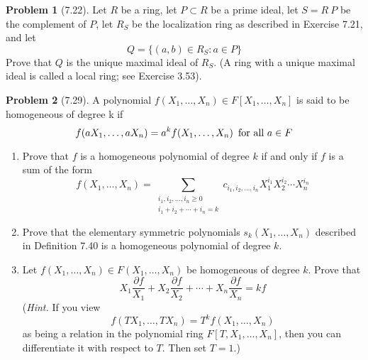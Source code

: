 \documentclass[12pt]{article}
\theoremstyle{definition}
\newtheorem{problem}{Problem}
\begin{document}
\begin{problem}[7.22]
    Let $R$ be a ring, let $P \subset R$ be a prime ideal, let $S = R \ P$ be the complement of $P$, let $R_S$
    be the localization ring as described in Exercise 7.21, and let
    \[
        Q = \{ (a, b) \in R_S : a \in P \}
    \]
    Prove that $Q$ is the unique maximal ideal of $R_S$. (A ring with a unique maximal ideal is called a local
    ring; see Exercise 3.53).

    \begin{solution}

    \end{solution}
\end{problem}

\begin{problem}[7.29]
    A polynomial $f(X_1, \ldots, X_n) \in F[X_1, \ldots, X_n]$ is said to be homogeneous of degree k if
    \[
        f(aX_1, \ldots, aX_n) = a^kf(X_1, \ldots, X_n) \hspace{5px} \text{for all } a \in F
    \]
    \begin{enumerate}[label=(\alph*)]
        \item Prove that $f$ is a homogeneous polynomial of degree $k$ if and only if $f$ is a sum of the form
              \[
                f(X_1, \ldots, X_n) = \sum_{\substack{i_1, i_2, \ldots, i_n \geq 0\\ i_1 + i_2 + \cdots + i_n = k}} c_{i_1, i_2, \ldots, i_n} X_1^{i_1} X_2^{i_2} \cdots X_n^{i_n}
              \]
        \begin{solution}

        \end{solution}

        \item Prove that the elementary symmetric polynomials $s_k (X_1, \ldots, X_n)$ described in Definition 7.40
              is a homogeneous polynomial of degree $k$.
        \begin{solution}

        \end{solution}

        \item Let $f(X_1, \ldots, X_n) \in F(X_1, \ldots, X_n)$ be homogeneous of degree $k$. Prove that
              \[
                X_1 \frac{\partial{f}}{X_1} + X_2 \frac{\partial{f}}{X_2} + \cdots + X_n \frac{\partial{f}}{X_n} = kf
              \]
              (\textit{Hint.} If you view
              \[
                f(TX_1, \ldots, TX_n) = T^k f(X_1, \ldots, X_n)
              \]
              as being a relation in the polynomial ring $F[T, X_1, \ldots, X_n]$, then you can differentiate it with
              respect to $T$. Then set $T = 1$.)
        \begin{solution}

        \end{solution}
    \end{enumerate}
\end{problem}
\end{document}
